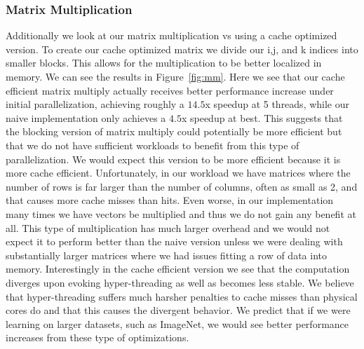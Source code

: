 \subsubsection{Matrix Multiplication}

Additionally we look at our matrix multiplication vs using a cache optimized
version. To create our cache optimized matrix we divide our i,j, and k indices
into smaller blocks. This allows for the multiplication to be better localized
in memory. We can see the results in Figure~\ref{fig:mm}. Here we see that our
cache efficient matrix multiply actually receives better performance increase
under initial parallelization, achieving roughly a $14.5$x speedup at 5 threads,
while our naive implementation only achieves a $4.5$x speedup at best. This
suggests that the blocking version of matrix multiply could potentially be more
efficient but that we do not have sufficient workloads to benefit from this type
of parallelization. We would expect this version to be more efficient because it
is more cache efficient. Unfortunately, in our workload we have matrices where
the number of rows is far larger than the number of columns, often as small as
2, and that causes more cache misses than hits. Even worse, in our
implementation many times we have vectors be multiplied and thus we do not gain
any benefit at all. This type of multiplication has much larger overhead and we
would not expect it to perform better than the naive version unless we were
dealing with substantially larger matrices where we had issues fitting a row of
data into memory. Interestingly in the cache efficient version we see that the
computation diverges upon evoking hyper-threading as well as becomes less
stable. We believe that hyper-threading suffers much harsher penalties to cache
misses than physical cores do and that this causes the divergent behavior. We
predict that if we were learning on larger datasets, such as ImageNet, we would
see better performance increases from these type of optimizations. 



